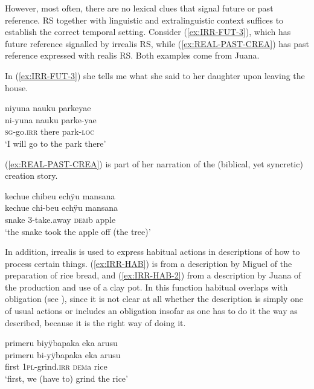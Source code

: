 However, most often, there are no lexical clues that signal future or past reference. RS together with linguistic and extralinguistic context suffices to establish the correct temporal setting. Consider (\ref{ex:IRR-FUT-3}), which has future reference signalled by irrealis RS, while (\ref{ex:REAL-PAST-CREA}) has past reference expressed with realis RS. Both examples come from Juana.

In (\ref{ex:IRR-FUT-3}) she tells me what she said to her daughter upon leaving the house.

\ea\label{ex:IRR-FUT-3}
\begingl 
\glpreamble niyuna nauku parkeyae\\
\gla ni-yuna nauku parke-yae\\ 
\textsc{sg}-go.\textsc{irr} there park-\textsc{loc}\\ 
\glft ‘I will go to the park there’\\ 
\endgl
 \trailingcitation{[jxx-p120430l-2.242]}
\xe
{}

(\ref{ex:REAL-PAST-CREA}) is part of her narration of the (biblical, yet syncretic) creation story.

\ea\label{ex:REAL-PAST-CREA}
\begingl 
\glpreamble kechue chibeu echÿu mansana\\
\gla kechue chi-beu echÿu mansana\\ 
\glb snake 3-take.away \textsc{dem}b apple\\ 
\glft ‘the snake took the apple off (the tree)’\\ 
\endgl
 \trailingcitation{[jxx-n101013s-1.410]}
\xe

In addition, irrealis is used to express habitual actions in descriptions of how to process certain things. (\ref{ex:IRR-HAB}) is from a description by Miguel of the preparation of rice bread, and (\ref{ex:IRR-HAB-2}) from a description by Juana of the production and use of a clay pot. In this function habitual overlaps with obligation (see ), since it is not clear at all whether the description is simply one of usual actions or includes an obligation insofar as one has to do it the way as described, because it is the right way of doing it.

\ea\label{ex:IRR-HAB}
\begingl 
\glpreamble primeru biyÿbapaka eka arusu\\
\gla primeru bi-yÿbapaka eka arusu\\ 
\glb first 1\textsc{pl}-grind.\textsc{irr} \textsc{dem}a rice\\ 
\glft ‘first, we (have to) grind the rice’\\ 
\endgl
 \trailingcitation{[mxx-d120411ls-1a.018]}
\xe

